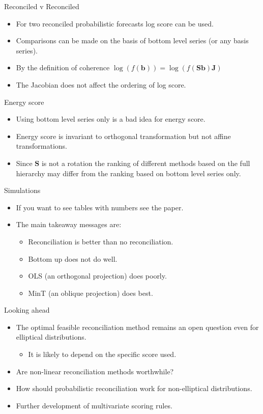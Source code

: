 \documentclass{beamer}
\begin{document}
  \begin{frame}{Reconciled v Reconciled}
	\begin{itemize}
		\item For two reconciled probabilistic forecasts log score can be used.
		\item Comparisons can be made on the basis of bottom level series (or any basis series).
		\item By the definition of coherence $\log (f({\bm b}))=\log (f({\bm S}{\bm b}){\bm J})$
		\item The Jacobian does not affect the ordering of log score.
	\end{itemize}
  \end{frame}
  \begin{frame}{Energy  score}
  	\begin{itemize}
  		\item Using bottom level series only is a bad idea for energy score.
  		\item Energy score is invariant to orthogonal transformation but not affine transformations.
  		\item Since ${\bm S}$ is not a rotation the ranking of different methods based on the full hierarchy may differ from the ranking based on bottom level series only.
  	\end{itemize}
  \end{frame}
   \begin{frame}{Simulations}
   	\begin{itemize}
   		\item If you want to see tables with numbers see the paper.
   		\item The main takeaway messages are:
   		    \begin{itemize}
   		    	\item Reconciliation is better than no reconciliation.
   		    	\item Bottom up does not do well.
   		    	\item OLS (an orthogonal projection) does poorly.
   		    	\item MinT (an oblique projection) does best.
   		    \end{itemize} 
   	\end{itemize}
   \end{frame}
   \begin{frame}{Looking ahead}
     \begin{itemize}
     	\item The optimal feasible reconciliation method remains an open question even for elliptical distributions.
     	\begin{itemize}
     		\item It is likely to depend on the specific score used.
     	\end{itemize}
        \item Are non-linear reconciliation methods worthwhile?
        \item How should probabilistic reconciliation work for non-elliptical distributions.
        \item Further development of multivariate scoring rules.
     \end{itemize}	
   \end{frame}
\end{document}
